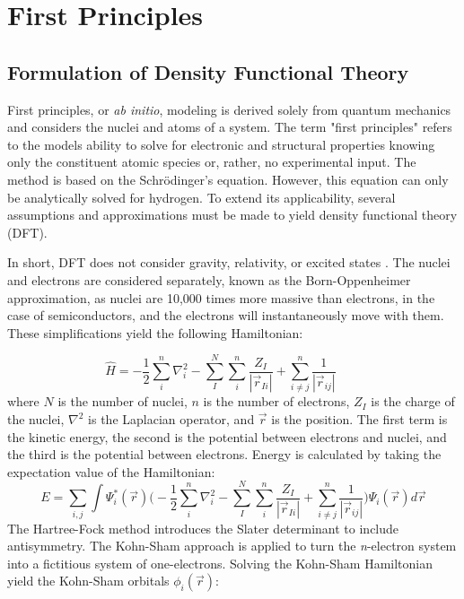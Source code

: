 \documentclass[3p,review,12pt]{elsarticle}
\begin{document}
\section{First Principles}
\subsection{Formulation of Density Functional Theory}
First principles, or \emph{ab initio}, modeling is derived solely from quantum mechanics and considers the nuclei and atoms of a system. The term "first principles" refers to the models ability to solve for electronic and structural properties knowing only the constituent atomic species or, rather, no experimental input. The method is based on the Schr\"odinger's equation. However, this equation can only be analytically solved for hydrogen. To extend its applicability, several assumptions and approximations must be made to yield density functional theory (DFT).
\par 
In short, DFT does not consider gravity, relativity, or excited states \cite{Lee2012}. The nuclei and electrons are considered separately, known as the Born-Oppenheimer approximation, as nuclei are 10,000 times more massive than electrons, in the case of semiconductors, and the electrons will instantaneously move with them.  These simplifications yield the following Hamiltonian:

\begin{equation}
\hat{H}=-\frac{1}{2}\sum_{i}^{n}\nabla_{i}^{2}-\sum_{I}^{N}\sum_{i}^{n}\frac{Z_{I}}{|\vec{r}_{Ii}|}+\sum_{i\neq j}^{n}\frac{1}{|\vec{r}_{ij}|} \qquad 
\end{equation}
where $N$ is the number of nuclei, $n$ is the number of electrons, $Z_{I}$ is the charge of the nuclei, $\nabla^{2}$ is the Laplacian operator, and $\vec{r}$ is the position. The first term is the kinetic energy, the second is the potential between electrons and nuclei, and the third is the potential between electrons. Energy is calculated by taking the expectation value of the Hamiltonian:
\begin{equation}
	E = \sum_{i,j} \int \Psi_{i}^{*} (\vec{r}) \Bigg(-\frac{1}{2}\sum_{i}^{n}\nabla_{i}^{2}-\sum_{I}^{N}\sum_{i}^{n}\frac{Z_{I}}{|\vec{r}_{Ii}|}+\sum_{i\neq j}^{n}\frac{1}{|\vec{r}_{ij}|}\Bigg)\Psi_{i}(\vec{r})d\vec{r}
\end{equation}
 The Hartree-Fock method introduces the Slater determinant to include antisymmetry. The Kohn-Sham approach is applied to turn the \emph{n}-electron system into a fictitious system of one-electrons. Solving the Kohn-Sham Hamiltonian yield the Kohn-Sham orbitals $\phi_{i}(\vec{r})$:
 
\end{document}
